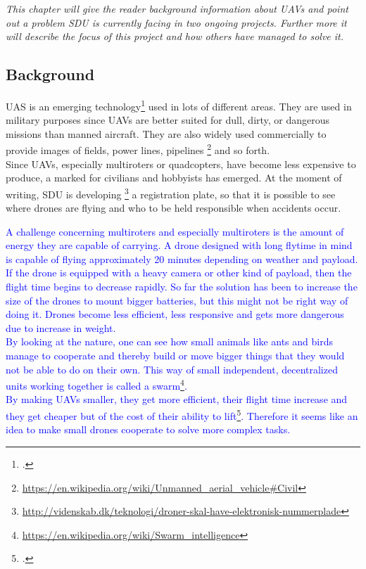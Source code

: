 \textit{This chapter will give the reader background information about UAVs and point out a problem SDU is currently facing in two ongoing projects. Further more it will describe the focus of this project and how others have managed to solve it.}
\subsection*{Background}
UAS is an emerging technology\footcite{gupta2013review} used in lots of different areas. They are used in military purposes since UAVs are better suited for dull, dirty, or dangerous missions than manned aircraft. They are also widely used commercially to provide images of fields, power lines, pipelines \footnote{\url{https://en.wikipedia.org/wiki/Unmanned\_aerial\_vehicle\#Civil}} and so forth.\\
Since UAVs, especially multiroters or quadcopters, have become less expensive to produce, a marked for civilians and hobbyists has emerged. At the moment of writing, SDU is developing \footnote{\url{http://videnskab.dk/teknologi/droner-skal-have-elektronisk-nummerplade}} a registration plate, so that it is possible to see where drones are flying and who to be held responsible when accidents occur.

\textcolor{blue}{A challenge concerning multiroters and especially multiroters is the amount of energy they are capable of carrying. A drone designed with long flytime in mind is capable of flying approximately 20 minutes depending on weather and payload. If the drone is equipped with a heavy camera or other kind of payload, then the flight time begins to decrease rapidly. So far the solution has been to increase the size of the drones to mount bigger batteries, but this might not be right way of doing it. Drones become less efficient, less responsive and gets more dangerous due to increase in weight.\\
By looking at the nature, one can see how small animals like ants and birds manage to cooperate and thereby build or move bigger things that they would not be able to do on their own. This way of small independent, decentralized units working together is called a swarm\footnote{\url{https://en.wikipedia.org/wiki/Swarm\_intelligence}}.\\
By making UAVs smaller, they get more efficient, their flight time increase and they get cheaper but of the cost of their ability to lift\footcite{1_kumar_2016}. Therefore it seems like an idea to make small drones cooperate to solve more complex tasks.} \\

